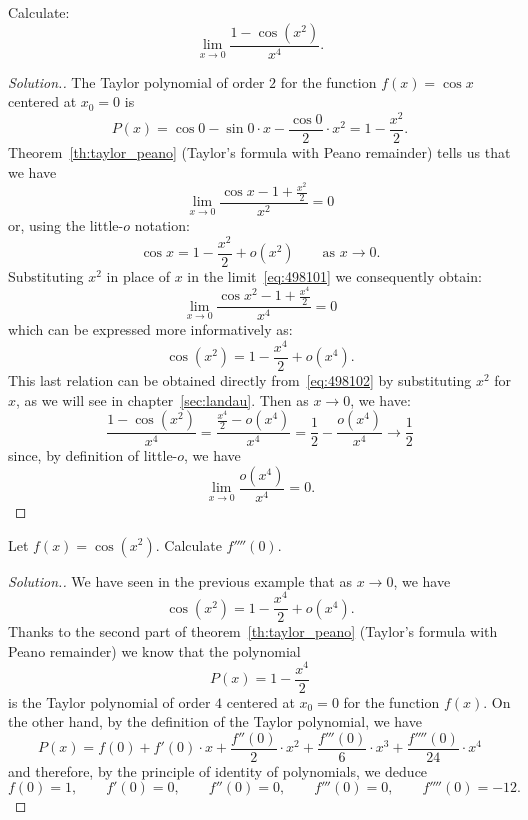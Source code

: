 \begin{exercise}
Calculate:
\[
  \lim_{x\to 0} \frac{1-\cos(x^2)}{x^4}.
\]
\end{exercise}
\begin{proof}[Solution.]
The Taylor polynomial of order $2$ for the function $f(x) = \cos x$ 
centered at $x_0=0$ is 
\[ 
  P(x)
   = \cos 0 - \sin 0\cdot x -\frac{\cos 0}{2} \cdot x^2 
   = 1 - \frac{x^2}{2}.
\]
Theorem~\ref{th:taylor_peano} (Taylor's formula with Peano remainder)
tells us that we have  
\begin{equation}\label{eq:498101}
   \lim_{x\to 0} \frac{\cos x - 1 + \frac {x^2}{2}}{x^2} = 0
\end{equation}
or, using the little-$o$ notation:
\begin{equation}\label{eq:498102}
  \cos x = 1 - \frac{x^2}{2} + o(x^2)
  \qquad \text{as $x\to 0.$}
\end{equation}
Substituting $x^2$ in place of $x$ in the limit~\eqref{eq:498101} 
we consequently obtain:
\begin{equation}\label{eq:498103}
  \lim_{x\to 0}\frac{\cos x^2 -1 + \frac{x^4}{2}}{x^4} = 0
\end{equation}
which can be expressed more informatively as:
\[
  \cos (x^2) = 1 - \frac{x^4}{2} + o(x^4).
\]
This last relation can be obtained directly 
from~\eqref{eq:498102} by substituting $x^2$ for $x$, 
as we will see in chapter~\ref{sec:landau}.
Then as $x\to 0$, we have:
\[
  \frac{1-\cos(x^2)}{x^4} 
  = \frac{\frac{x^4}{2} - o(x^4)}{x^4} 
  = \frac 1 2 - \frac{o(x^4)}{x^4} \to \frac 1 2
\]
since, by definition of little-$o$, we have
\[
  \lim_{x\to 0 } \frac{o(x^4)}{x^4} = 0.
\]
\end{proof}

\begin{example}
Let $f(x) = \cos(x^2)$. Calculate $f''''(0)$.
\end{example}
\begin{proof}[Solution.]
We have seen in the previous example that as $x\to 0$, we have 
\[
  \cos(x^2) = 1 - \frac{x^4}{2} + o(x^4).
\]
Thanks to the second part of theorem~\ref{th:taylor_peano} (Taylor's formula
with Peano remainder)
we know that the polynomial 
\[
  P(x) = 1 - \frac{x^4}{2}
\]
is the Taylor polynomial of order $4$ centered at $x_0=0$ for the function
$f(x)$.
On the other hand, by the definition of the Taylor polynomial, we have
\[
  P(x) = f(0) + f'(0) \cdot x + \frac{f''(0)}{2} \cdot x^2 
  + \frac{f'''(0)}{6} \cdot x^3 + \frac{f''''(0)}{24} \cdot x^4
\]
and therefore, by the principle of identity of polynomials, we deduce
\[
  f(0) = 1,\qquad
  f'(0) = 0,\qquad
  f''(0) = 0,\qquad
  f'''(0) = 0,\qquad
  f''''(0) = -12.
\]
\end{proof}

